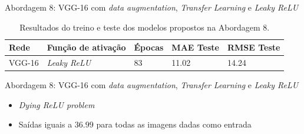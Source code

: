 \begin{frame}{Abordagem 8: VGG-16 com \emph{data augmentation}, \emph{Transfer Learning} e \emph{Leaky ReLU}}
  \begin{table}[!ht]
  \centering
  \caption{Resultados do treino e teste dos modelos propostos na Abordagem 8.}
  \label{tab:results-8}
   \begin{tabular}{l l l l l }
  	 \toprule
  	 Rede & Função de ativação & Épocas & MAE Teste & RMSE Teste \\
  	 \midrule
  	 VGG-16 & \emph{Leaky ReLU} & 83 & 11.02 & 14.24 \\
  	 \bottomrule
   \end{tabular}
 \end{table}
\end{frame}

\begin{frame}{Abordagem 8: VGG-16 com \emph{data augmentation}, \emph{Transfer Learning} e \emph{Leaky ReLU}}
  \begin{itemize}
    \item \emph{Dying ReLU problem}
    \item Saídas iguais a $36.99$ para todas as imagens dadas como entrada
  \end{itemize}
\end{frame}




